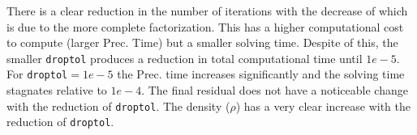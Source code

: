 \documentclass[a4paper, 11pt]{article}
\begin{document}
			There is a clear reduction in the number of iterations with the decrease of  which is due to the more complete factorization.
			This has a higher computational cost to compute (larger Prec. Time) but a smaller solving time.
			Despite of this, the smaller \texttt{droptol} produces a reduction in total computational time until $1e-5$.
			For \texttt{droptol}$  = 1e-5 $ the Prec. time increases significantly and the solving time stagnates relative to $ 1e-4 $.  
			The final residual does not have a noticeable change with the reduction of \texttt{droptol}.
			The density ($ \rho $) has a very clear increase with the reduction of \texttt{droptol}.			
	
\end{document}
